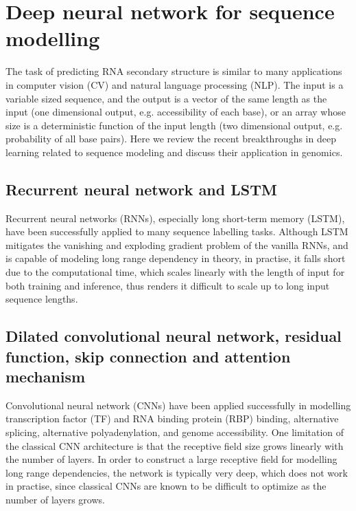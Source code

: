 \documentclass{proposal}
\begin{document}
\section{Deep neural network for sequence modelling}

The task of predicting RNA secondary structure is similar to many applications in
computer vision (CV) and natural language processing (NLP).
The input is a variable sized sequence,
and the output is a vector of the same length as the input (one dimensional output, e.g. accessibility of each base),
or an array whose size is a deterministic function of the input length (two dimensional output, e.g. probability of all base pairs).
Here we review the recent breakthroughs in deep learning related to sequence modeling and discuss their application in genomics.


\subsection*{Recurrent neural network and LSTM}

Recurrent neural networks (RNNs), especially long short-term memory (LSTM)\cite{hochreiter1997long},
have been successfully applied to many sequence labelling tasks.
Although LSTM mitigates the vanishing and exploding gradient problem of the vanilla RNNs,
and is capable of modeling long range dependency in theory,
in practise, it falls short due to the computational time,
which scales linearly with the length of input for both training and inference,
thus renders it difficult to scale up to long input sequence lengths.

\subsection*{Dilated convolutional neural network, residual function, skip connection and attention mechanism}


Convolutional neural network (CNNs) have been applied successfully in
modelling transcription factor (TF) and RNA binding protein (RBP) binding\cite{alipanahi2015predicting, gandhi2018cdeepbind},
alternative splicing\cite{bretschneider2018cossmo}, alternative polyadenylation\cite{leung2018inference},
and genome accessibility\cite{kelley2016basset}.
One limitation of the classical CNN architecture is that the receptive field size grows linearly with the number of
layers. In order to construct a large receptive field for modelling long range dependencies,
the network is typically very deep, which does not work in practise,
since classical CNNs are known to be difficult to optimize as the number of layers grows.
\end{document}
